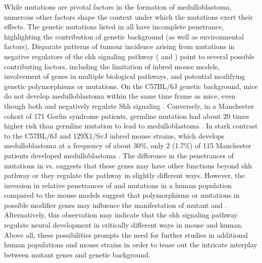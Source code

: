 While mutations are pivotal factors in the formation of medulloblastoma, numerous other factors shape the context under which the mutations exert their effects. The genetic mutations listed in  all have incomplete penetrance, highlighting the contribution of genetic background (as well as environmental factors). Disparate patterns of tumour incidence arising from mutations in negative regulators of the \gls{shh} signaling pathway ( and ) point to several possible contributing factors, including the limitation of inbred mouse models, involvement of genes in multiple biological pathways, and potential modifying genetic polymorphisms or mutations. On the C57BL/6J genetic background, \high{+/-} mice do not develop medulloblastoma within the same time frame as \high{+/-} mice, even though both  and  negatively regulate Shh signaling . Conversely, in a Manchester cohort of 171 Gorlin syndrome patients, germline  mutation had about 20 times higher risk than germline  mutation to lead to medulloblastoma . In stark contrast to the C57BL/6J and 129X1/SvJ inbred mouse strains, which develops medulloblastoma at a frequency of about 30\%, only 2 (1.7\%) of 115 Manchester patients developed medulloblastoma . The difference in the penetrances of mutations in  vs.  suggests that these genes may have other functions beyond \gls{shh} pathway or they regulate the pathway in slightly different ways. However, the inversion in relative penetrances of  and  mutations in a human population compared to the mouse models suggest that polymorphisms or mutations in possible modifier genes may influence the manifestation of mutant  and . Alternatively, this observation may indicate that the \gls{shh} signaling pathway regulate neural development in critically different ways in mouse and human. Above all, these possibilities prompts the need for further studies in additional human populations and mouse strains in order to tease out the intricate interplay between mutant genes and genetic background. 

